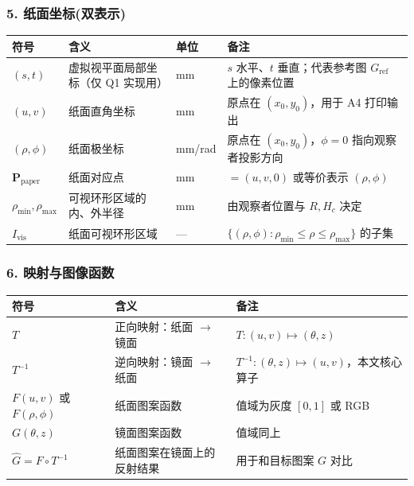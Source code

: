 \documentclass[12pt, a4paper]{ctexart}
\begin{document}
\subsubsection*{5. 纸面坐标(双表示)}
\begin{table}[H]
\centering
\begin{tabularx}{\textwidth}{lllX}
\toprule
\textbf{符号} & \textbf{含义} & \textbf{单位} & \textbf{备注} \\
\midrule
$(s, t)$ & 虚拟视平面局部坐标（仅 Q1 实现用） & mm & $s$ 水平、$t$ 垂直；代表参考图 $G_{\mathrm{ref}}$ 上的像素位置 \\
$(u, v)$ & 纸面直角坐标 & mm & 原点在 $(x_0, y_0)$，用于 A4 打印输出 \\
$(\rho, \phi)$ & 纸面极坐标 & mm/rad & 原点在 $(x_0, y_0)$，$\phi = 0$ 指向观察者投影方向 \\
$\mathbf{P}_{\mathrm{paper}}$ & 纸面对应点 & mm & $= (u, v, 0)$ 或等价表示 $(\rho, \phi)$ \\
$\rho_{\min}, \rho_{\max}$ & 可视环形区域的内、外半径 & mm & 由观察者位置与 $R,H_c$ 决定 \\
$I_{\mathrm{vis}}$ & 纸面可视环形区域 & --- & $\{(\rho, \phi) : \rho_{\min} \leq \rho \leq \rho_{\max}\}$ 的子集 \\
\bottomrule
\end{tabularx}
\end{table}

\subsubsection*{6. 映射与图像函数}
\begin{table}[H]
\centering
\begin{tabularx}{\textwidth}{llX}
\toprule
\textbf{符号} & \textbf{含义} & \textbf{备注} \\
\midrule
$T$ & 正向映射：纸面 $\rightarrow$ 镜面 & $T: (u, v) \mapsto (\theta, z)$ \\
$T^{-1}$ & 逆向映射：镜面 $\rightarrow$ 纸面 & $T^{-1}: (\theta, z) \mapsto (u, v)$，本文核心算子 \\
$F(u, v)$ 或 $F(\rho, \phi)$ & 纸面图案函数 & 值域为灰度 $[0, 1]$ 或 RGB \\
$G(\theta, z)$ & 镜面图案函数 & 值域同上 \\
$\hat{G} = F \circ T^{-1}$ & 纸面图案在镜面上的反射结果 & 用于和目标图案 $G$ 对比 \\
\bottomrule
\end{tabularx}
\end{table}
\end{document}
